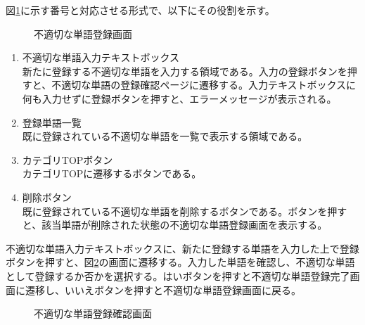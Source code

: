 \documentclass[a4j]{jarticle}
\begin{document}
図\ref{fig:NGword}に示す番号と対応させる形式で、以下にその役割を示す。
\begin{figure}[H]
\centering
{}
\caption{不適切な単語登録画面}
\label{fig:NGword}
\end{figure}
\begin{enumerate}
  \renewcommand{\labelenumi}{\textcircled{\scriptsize \theenumi}}
  \item 不適切な単語入力テキストボックス\\
  新たに登録する不適切な単語を入力する領域である。入力の登録ボタンを押すと、不適切な単語の登録確認ページに遷移する。入力テキストボックスに何も入力せずに登録ボタンを押すと、エラーメッセージが表示される。
  \item 登録単語一覧\\
  既に登録されている不適切な単語を一覧で表示する領域である。
  \item カテゴリTOPボタン\\
  カテゴリTOPに遷移するボタンである。
  \item 削除ボタン\\
  既に登録されている不適切な単語を削除するボタンである。ボタンを押すと、該当単語が削除された状態の不適切な単語登録画面を表示する。
\end{enumerate}
不適切な単語入力テキストボックスに、新たに登録する単語を入力した上で登録ボタンを押すと、図\ref{fig:NGword_confirm}の画面に遷移する。入力した単語を確認し、不適切な単語として登録するか否かを選択する。はいボタンを押すと不適切な単語登録完了画面に遷移し、いいえボタンを押すと不適切な単語登録画面に戻る。
\begin{figure}[H]
\centering
{}
\caption{不適切な単語登録確認画面}
\label{fig:NGword_confirm}
\end{figure}
\end{document}
